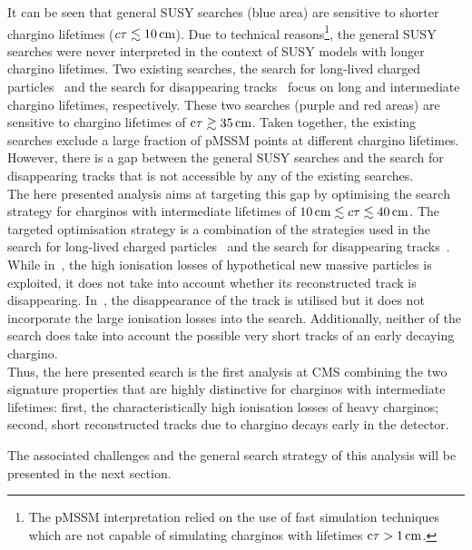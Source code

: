 It can be seen that general SUSY searches (blue area) are sensitive to shorter chargino lifetimes ($c\tau \lesssim 10\,\text{cm}$). 
Due to technical reasons\footnote{The pMSSM interpretation relied on the use of fast simulation techniques which are not capable of simulating charginos with lifetimes $\text{c}\tau>1\,\text{cm}$.}, the general SUSY searches were never interpreted in the context of SUSY models with longer chargino lifetimes. 
Two existing searches, the search for long-lived charged particles~\cite{bib:CMS:HSCP_8TeV} and the search for disappearing tracks~\cite{bib:CMS:DT_8TeV} focus on long and intermediate chargino lifetimes, respectively. 
These two searches (purple and red areas) are sensitive to chargino lifetimes of $\text{c}\tau \gtrsim 35\,\text{cm}$.
Taken together, the existing searches exclude a large fraction of pMSSM points at different chargino lifetimes. 
However, there is a gap between the general SUSY searches and the search for disappearing tracks that is not accessible by any of the existing searches.\\

The here presented analysis aims at targeting this gap by optimising the search strategy for charginos with intermediate lifetimes of $10\,\text{cm} \lesssim c\tau \lesssim 40\,\text{cm}$. 
The targeted optimisation strategy is a combination of the strategies used in the search for long-lived charged particles~\cite{bib:CMS:HSCP_8TeV} and the search for disappearing tracks~\cite{bib:CMS:DT_8TeV}.
While in~\cite{bib:CMS:HSCP_8TeV}, the high ionisation losses of hypothetical new massive particles is exploited, it does not take into account whether its reconstructed track is disappearing.
In~\cite{bib:CMS:DT_8TeV}, the disappearance of the track is utilised but it does not incorporate the large ionisation losses into the search.
Additionally, neither of the search does take into account the possible very short tracks of an early decaying chargino.\\

Thus, the here presented search is the first analysis at CMS combining the two signature properties that are highly distinctive for charginos with intermediate lifetimes: 
first, the characteristically high ionisation losses of heavy charginos;
second, short reconstructed tracks due to chargino decays early in the detector. 

The associated challenges and the general search strategy of this analysis will be presented in the next section.

